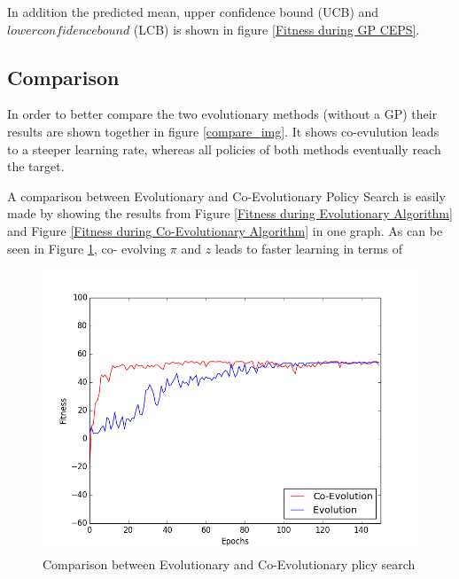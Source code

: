 In addition the predicted mean, upper confidence bound (UCB) and $lower confidence bound$ (LCB) is shown in figure \ref{Fitness during GP CEPS}. 



\subsection{Comparison}
In order to better compare the two evolutionary methods (without a GP) their results are shown together in figure \ref{compare_img}. It shows co-evulution leads to a steeper learning rate, whereas all policies of both methods eventually reach the target.



A comparison between Evolutionary and Co-Evolutionary Policy Search is easily made by showing the results from Figure \ref{Fitness during Evolutionary Algorithm} and Figure \ref{Fitness during Co-Evolutionary Algorithm} in one graph. As can be seen in Figure \ref{comparison}, co-
evolving $\pi$ and $z$ leads to faster learning in terms of 

\begin{figure}[ht]
  \centering
  \includegraphics[scale=0.5]{images/together.png}
  \caption{Comparison between Evolutionary and Co-Evolutionary plicy search}\label{comparison}
\end{figure}

